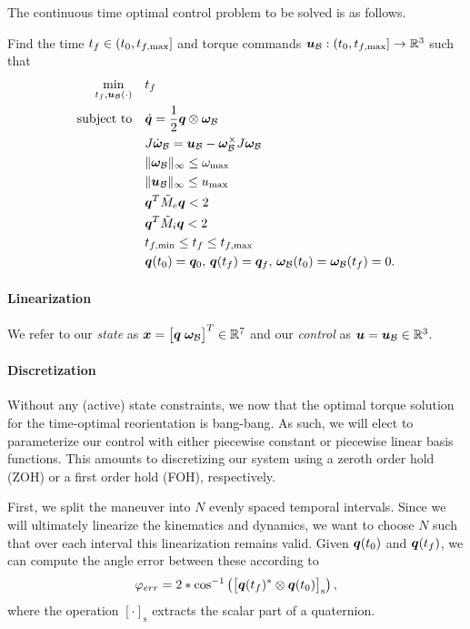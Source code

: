 \documentclass[12pt]{article}
\begin{document}
The continuous time optimal control problem to be solved is as follows. 
\begin{problem}\label{prob:prob1}
Find the time $t_f\in(t_0,t_{f,\max}]$ and torque commands $\bm{u}_{\mathcal{B}} : (t_0,t_{f,\max}] \rightarrow {\mathbb{R}}^3$ such that
\begin{subequations}
\begin{align}
\min_{t_f,\bm{u}_{\mathcal{B}}(\cdot)} &\quad t_f \\
\text{subject to} &\quad \dot{\bm{q}} = \frac{1}{2} \bm{q} \otimes \bm{\omega}_{\mathcal{B}}\\
&\quad J \dot{\bm{\omega}}_{\mathcal{B}} = \bm{u}_{\mathcal{B}} - \bm{\omega}_{\mathcal{B}}^{\times} J \bm{\omega}_{\mathcal{B}} \\
&\quad \| \bm{\omega}_{\mathcal{B}} \|_{\infty} \leq \omega_{\max} \\
&\quad \| \bm{u}_{\mathcal{B}} \|_{\infty} \leq u_{\max} \\
&\quad \bm{q}^T \tilde{M}_e \bm{q} < 2 \\
&\quad \bm{q}^T \tilde{M}_i \bm{q} < 2 \\
&\quad t_{f,\min} \leq t_f \leq t_{f,\max} \\
&\quad \bm{q}(t_0) = \bm{q}_0,\, \bm{q}(t_f) = \bm{q}_f,\,\bm{\omega}_{\mathcal{B}}(t_0) = \bm{\omega}_{\mathcal{B}}(t_f) = 0.
\end{align}
\end{subequations}
\end{problem} 

\paragraph{Linearization}
We refer to our \textit{state} as $\bm{x} = \big[ \bm{q} \; \bm{\omega}_{\mathcal{B}} \big]^T \in {\mathbb{R}}^7$ and our \textit{control} as $\bm{u} = \bm{u}_{\mathcal{B}} \in {\mathbb{R}}^3$. 


\paragraph{Discretization}

Without any (active) state constraints, we now that the optimal torque solution for the time-optimal reorientation is bang-bang. As such, we will elect to parameterize our control with either piecewise constant or piecewise linear basis functions. This amounts to discretizing our system using a zeroth order hold (ZOH) or a first order hold (FOH), respectively. 

First, we split the maneuver into $N$ evenly spaced temporal intervals. Since we will ultimately linearize the kinematics and dynamics, we want to choose $N$ such that over each interval this linearization remains valid. Given $\bm{q}(t_0)$ and $\bm{q}(t_f)$, we can compute the angle error between these according to
\begin{equation}
\varphi_{err} = 2*\cos^{-1} \left( \big[ \bm{q}(t_f)^* \otimes \bm{q}(t_0) \big]_{\text{s}} \right),
\label{eq:err_angle}
\end{equation}
where the operation $[\cdot]_{\text{s}}$ extracts the scalar part of a quaternion. 
\end{document}

